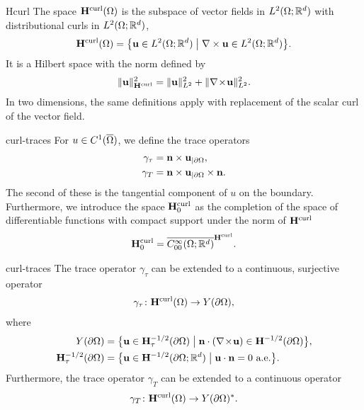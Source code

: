 \begin{Definition}{Hcurl}
  The space $\mathbf H^{\text{curl}}(\Omega)$ is the subspace of vector fields in
  $L^2(\Omega;\mathbb R^d)$ with distributional curls in $L^2(\Omega;\mathbb R^d)$,
  \begin{gather}
    \mathbf H^{\text{curl}}(\Omega) = \bigl\{ \mathbf u \in L^2(\Omega;\mathbb R^d) \; \big\vert
    \; \nabla \times \mathbf u \in L^2(\Omega;\mathbb R^d) \bigr\}.
  \end{gather}
  It is a Hilbert space with the norm defined by
  \begin{gather}
    \lVert\mathbf u\rVert_{\mathbf H^{\text{curl}}}^2 = \lVert\mathbf u\rVert_{L^2}^2 + \lVert\nabla\!\times\!\mathbf u\rVert_{L^2}^2.
  \end{gather}
  In two dimensions, the same definitions apply with replacement of
  the scalar curl of the vector field.
\end{Definition}

\begin{Definition}{curl-traces}
  For $u\in C^1(\overline{\Omega})$, we define the trace operators
  \begin{gather}
    \label{eq:maxwell:4}
    \begin{split}
      \gamma_{\tau} &= \mathbf n\times \mathbf u_{|\partial\Omega}, \\
      \gamma_{T} &= \mathbf n\times \mathbf u_{|\partial\Omega} \times \mathbf n.\\
    \end{split}
  \end{gather}
  The second of these is the tangential component of $u$ on the
  boundary. Furthermore, we introduce the space $\mathbf H^{\text{curl}}_0$ as the
  completion of the space of differentiable functions with compact
  support under the norm of $\mathbf H^{\text{curl}}$
  \begin{gather}
    \mathbf H^{\text{curl}}_0 = \overline{C^\infty_{00}(\Omega;\mathbb R^d)}^{\mathbf H^{\text{curl}}}.
  \end{gather}
\end{Definition}


\begin{Theorem}{curl-traces}
  The trace operator $\gamma_\tau$ can be extended to a continuous,
  surjective operator
  \begin{gather}
    \gamma_\tau \colon \mathbf H^{\text{curl}}(\Omega) \to Y(\partial\Omega),
  \end{gather}
  where
  \begin{gather}
    \label{eq:maxwell:5}
    \begin{split}
      Y(\partial\Omega) &= \bigl\{
      \mathbf u\in \mathbf H^{-1/2}_\tau(\partial\Omega)\; \big\vert
      \;\mathbf n\cdot(\nabla\!\times\! \mathbf u) \in \mathbf H^{-1/2}(\partial\Omega) \bigr\},\\
      \mathbf H^{-1/2}_\tau(\partial\Omega) &= \bigl\{
      \mathbf u\in \mathbf H^{-1/2}(\partial\Omega;\mathbb R^d) \;\big\vert \;
      \mathbf u\cdot\mathbf n=0 \text{ a.e.}\bigr\}.
    \end{split}
  \end{gather}
  Furthermore, the trace operator $\gamma_T$ can be extended to a
  continuous operator
  \begin{gather}
    \gamma_T \colon \mathbf H^{\text{curl}}(\Omega) \to Y(\partial\Omega)^*.
  \end{gather}
\end{Theorem}


